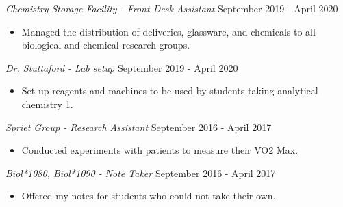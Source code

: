 \documentclass[a4paper]{article}
\begin{document}
\textit{Chemistry Storage Facility - Front Desk Assistant} \hfill September 2019 - April 2020\\
\vspace{-1mm}
\begin{itemize} \itemsep 1pt
	\item Managed the distribution of deliveries, glassware, and chemicals to all biological and chemical research groups.
\end{itemize}

\textit{Dr. Stuttaford - Lab setup} \hfill September 2019 - April 2020\\
\vspace{-1mm}
\begin{itemize} \itemsep 1pt
	\item Set up reagents and machines to be used by students taking analytical chemistry 1.
\end{itemize}

\textit{Spriet Group - Research Assistant} \hfill September 2016 - April 2017\\
\vspace{-1mm}
\begin{itemize} \itemsep 1pt
	\item Conducted experiments with patients to measure their VO2 Max.
\end{itemize}

\textit{Biol*1080, Biol*1090 - Note Taker} \hfill September 2016 - April 2017\\
\vspace{-1mm}
\begin{itemize} \itemsep 1pt
	\item Offered my notes for students who could not take their own.
\end{itemize}
\end{document}
